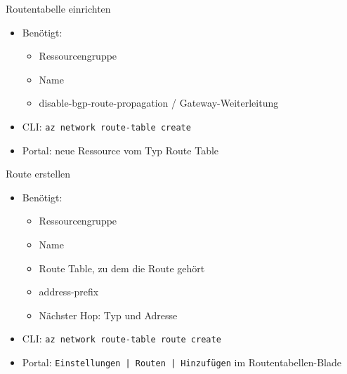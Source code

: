 \begin{flashcard}[Definition]{Routentabelle einrichten}
    \begin{itemize}
        \item Benötigt:
            \begin{itemize}
                \item Ressourcengruppe
                \item Name
                \item disable-bgp-route-propagation / Gateway-Weiterleitung
            \end{itemize}
        \item CLI: \texttt{az network route-table create}
        \item Portal: neue Ressource vom Typ Route Table
    \end{itemize}
\end{flashcard}

\begin{flashcard}[Definition]{Route erstellen}
    \begin{itemize}
        \item Benötigt:
            \begin{itemize}
                \item Ressourcengruppe
                \item Name
                \item Route Table, zu dem die Route gehört
                \item address-prefix
                \item Nächster Hop: Typ und Adresse
            \end{itemize}
        \item CLI: \texttt{az network route-table route create}
        \item Portal: \texttt{Einstellungen | Routen | Hinzufügen} im Routentabellen-Blade
    \end{itemize}
\end{flashcard}

